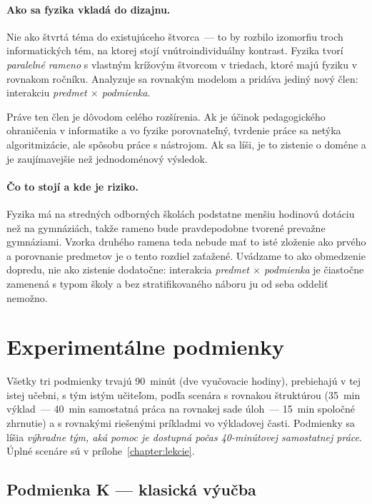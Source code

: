 \paragraph{Ako sa fyzika vkladá do dizajnu.} Nie ako štvrtá téma do existujúceho štvorca~--- to by rozbilo izomorfiu troch informatických tém, na ktorej stojí vnútroindividuálny kontrast. Fyzika tvorí \emph{paralelné rameno} s vlastným krížovým štvorcom v triedach, ktoré majú fyziku v rovnakom ročníku. Analyzuje sa rovnakým modelom a pridáva jediný nový člen: interakciu \emph{predmet $\times$ podmienka}.

Práve ten člen je dôvodom celého rozšírenia. Ak je účinok pedagogického ohraničenia v informatike a vo fyzike porovnateľný, tvrdenie práce sa netýka algoritmizácie, ale spôsobu práce s nástrojom. Ak sa líši, je to zistenie o doméne a je zaujímavejšie než jednodoménový výsledok.

\paragraph{Čo to stojí a kde je riziko.} Fyzika má na stredných odborných školách podstatne menšiu hodinovú dotáciu než na gymnáziách, takže rameno bude pravdepodobne tvorené prevažne gymnáziami. Vzorka druhého ramena teda nebude mať to isté zloženie ako prvého a porovnanie predmetov je o tento rozdiel zaťažené. Uvádzame to ako obmedzenie dopredu, nie ako zistenie dodatočne: interakcia \emph{predmet $\times$ podmienka} je čiastočne zamenená s typom školy a bez stratifikovaného náboru ju od seba oddeliť nemožno.


\section{Experimentálne podmienky}
\label{sec:podmienky}

Všetky tri podmienky trvajú 90~minút (dve vyučovacie hodiny), prebiehajú v tej istej učebni, s tým istým učiteľom, podľa scenára s rovnakou štruktúrou (35~min výklad~--- 40~min samostatná práca na rovnakej sade úloh~--- 15~min spoločné zhrnutie) a s rovnakými riešenými príkladmi vo výkladovej časti. Podmienky sa líšia \emph{výhradne tým, aká pomoc je dostupná počas 40-minútovej samostatnej práce}. Úplné scenáre sú v prílohe~\ref{chapter:lekcie}.

\subsection{Podmienka K --- klasická výučba}

